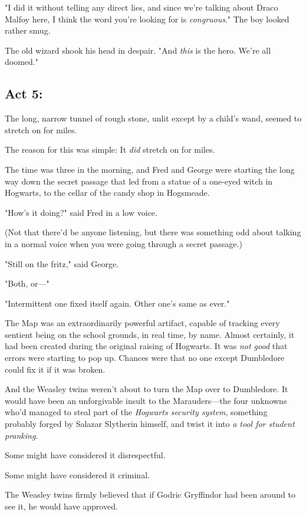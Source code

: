 "I did it without telling any direct lies, and since we're talking about Draco
Malfoy here, I think the word you're looking for is \emph{congruous}." The boy
looked rather smug.

The old wizard shook his head in despair. "And \emph{this} is the hero. We're
all doomed."
\sbreak
\subsection{Act 5:}

The long, narrow tunnel of rough stone, unlit except by a child's wand, seemed
to stretch on for miles.

The reason for this was simple: It \emph{did} stretch on for miles.

The time was three in the morning, and Fred and George were starting the long
way down the secret passage that led from a statue of a one-eyed witch in
Hogwarts, to the cellar of the candy shop in Hogsmeade.

"How's it doing?" said Fred in a low voice.

(Not that there'd be anyone listening, but there was something odd about
talking in a normal voice when you were going through a secret passage.)

"Still on the fritz," said George.

"Both, or\mbox{---}"

"Intermittent one fixed itself again. Other one's same as ever."

The Map was an extraordinarily powerful artifact, capable of tracking every
sentient being on the school grounds, in real time, by name. Almost certainly,
it had been created during the original raising of Hogwarts. It was \emph{not
good} that errors were starting to pop up. Chances were that no one except
Dumbledore could fix it if it was broken.

And the Weasley twins weren't about to turn the Map over to Dumbledore. It
would have been an unforgivable insult to the Marauders---the four unknowns
who'd managed to steal part of the \emph{Hogwarts security system}, something
probably forged by Salazar Slytherin himself, and twist it into \emph{a tool
for student \mbox{pranking}}.

Some might have considered it disrespectful.

Some might have considered it criminal.

The Weasley twins firmly believed that if Godric Gryffindor had been around to
see it, he would have approved.

